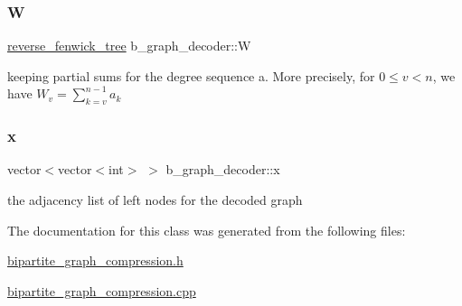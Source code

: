 \subsubsection{\texorpdfstring{W}{W}}
{\footnotesize\ttfamily \hyperlink{classreverse__fenwick__tree}{reverse\+\_\+fenwick\+\_\+tree} b\+\_\+graph\+\_\+decoder\+::W\hspace{0.3cm}{\ttfamily [private]}}



keeping partial sums for the degree sequence a. More precisely, for $0 \leq v < n$, we have $W_v = \sum_{k=v}^{n-1} a_k$ 

\mbox{\label{classb__graph__decoder_a6bba2e67984f9733fc60c40dd4956587}} 
\subsubsection{\texorpdfstring{x}{x}}
{\footnotesize\ttfamily vector$<$vector$<$int$>$ $>$ b\+\_\+graph\+\_\+decoder\+::x\hspace{0.3cm}{\ttfamily [private]}}



the adjacency list of left nodes for the decoded graph 



The documentation for this class was generated from the following files\+:\begin{DoxyCompactItemize}
\item 
\hyperlink{bipartite__graph__compression_8h}{bipartite\+\_\+graph\+\_\+compression.\+h}\item 
\hyperlink{bipartite__graph__compression_8cpp}{bipartite\+\_\+graph\+\_\+compression.\+cpp}\end{DoxyCompactItemize}
